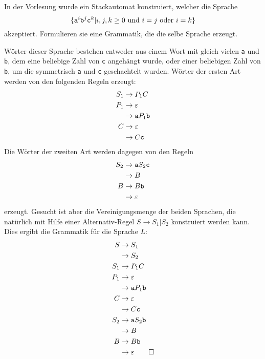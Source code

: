 In der Vorlesung wurde ein Stackautomat konstruiert, welcher die
Sprache
\[
\{{\tt a}^i{\tt b}^j{\tt c}^k|\text{$i,j,k\ge 0$ und $i=j$ oder $i=k$}\}
\]
akzeptiert.
Formulieren sie eine Grammatik, die die selbe Sprache erzeugt.

\begin{loesung}
Wörter dieser Sprache bestehen entweder aus einem Wort mit gleich
vielen {\tt a} und {\tt b}, dem eine beliebige Zahl von {\tt c}
angehängt wurde, oder einer beliebigen Zahl von {\tt b}, um die
symmetrisch {\tt a} und {\tt c} geschachtelt wurden.
Wörter der ersten Art werden von den folgenden Regeln erzeugt:
\begin{align*}
S_1&\to P_1C\\
P_1&\to\varepsilon\\
   &\to {\tt a}P_1{\tt b}\\
C  &\to\varepsilon\\
   &\to C{\tt c}
\end{align*}
Die Wörter der zweiten Art werden dagegen von den Regeln
\begin{align*}
S_2&\to{\tt a}S_2{\tt c}\\
   &\to B\\
B  &\to B{\tt b}\\
   &\to\varepsilon
\end{align*}
erzeugt.
Gesucht ist aber die Vereinigungsmenge der beiden Sprachen, die
natürlich mit Hilfe einer Alternativ-Regel $S\to S_1|S_2$
konstruiert werden kann.
Dies ergibt die Grammatik für die Sprache $L$:
\begin{align*}
S  &\to S_1\\
   &\to S_2\\
S_1&\to P_1C\\
P_1&\to\varepsilon\\
   &\to {\tt a}P_1{\tt b}\\
C  &\to\varepsilon\\
   &\to C{\tt c}\\
S_2&\to{\tt a}S_2{\tt b}\\
   &\to B\\
B  &\to B{\tt b}\\
   &\to\varepsilon
\qedhere
\end{align*}
\end{loesung}
